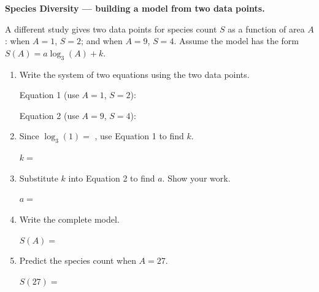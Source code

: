 \documentclass[10pt]{article}
\begin{document}
\vspace{0.1in}

\begin{tcolorbox}[colback=white, colframe=black!40,
    title=\textbf{Tier A --- Approaching Proficiency},
    fonttitle=\bfseries, arc=2mm, left=3mm, right=3mm, top=2mm, bottom=2mm]

\textbf{Species Diversity --- building a model from two data points.}

\vspace{4pt}
A different study gives two data points for species count $S$ as a function of area $A$:
when $A = 1$, $S = 2$; and when $A = 9$, $S = 4$. Assume the model has the form
$S(A) = a\log_3(A) + k$.

\begin{enumerate}[leftmargin=1.8em, itemsep=10pt]

\item Write the system of two equations using the two data points.

\vspace{4pt}
Equation 1 (use $A=1$, $S=2$): \blank{6cm}

\vspace{4pt}
Equation 2 (use $A=9$, $S=4$): \blank{6cm}

\item Since $\log_3(1) = $ \blank{1cm}, use Equation 1 to find $k$.

\vspace{4pt}
$k = $ \blank{2cm}

\item Substitute $k$ into Equation 2 to find $a$. Show your work.

\vspace{4pt}
$a = $ \blank{2cm}

\item Write the complete model.

\vspace{4pt}
$S(A) = $ \blank{5cm}

\item Predict the species count when $A = 27$.

\vspace{4pt}
$S(27) = $ \blank{6cm}

\end{enumerate}
\end{tcolorbox}

\vspace{0.1in}
\end{document}
